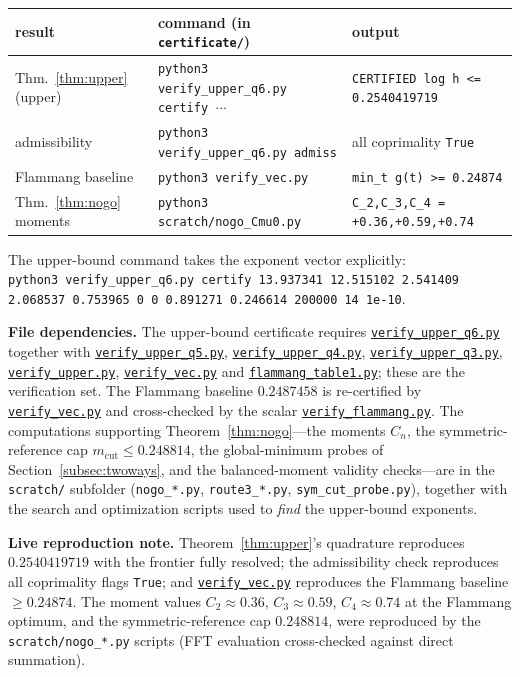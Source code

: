 \documentclass[11pt,reqno]{amsart}
\theoremstyle{plain}
\theoremstyle{definition}
\newcommand{\repofile}[1]{\href{https://github.com/tempcollab/optimizationproblems/blob/main/constants/82a/certificate/#1}{\texttt{#1}}}
\begin{document}
\begin{center}\small
\begin{tabular}{@{}lll@{}}
\toprule
result & command (in \texttt{certificate/}) & output\\
\midrule
Thm.~\ref{thm:upper} (upper) & \texttt{python3 verify\_upper\_q6.py certify} $\ \cdots$
  & \texttt{CERTIFIED log h <= 0.2540419719}\\
\;\;admissibility & \texttt{python3 verify\_upper\_q6.py admiss}
  & all coprimality \texttt{True}\\
Flammang baseline & \texttt{python3 verify\_vec.py}
  & \texttt{min\_t g(t) >= 0.24874}\\
Thm.~\ref{thm:nogo} moments & \texttt{python3 scratch/nogo\_Cmu0.py}
  & \texttt{C\_2,C\_3,C\_4 = +0.36,+0.59,+0.74}\\
\bottomrule
\end{tabular}
\end{center}

\noindent The upper-bound command takes the exponent vector explicitly:\\
\texttt{python3 verify\_upper\_q6.py certify 13.937341 12.515102 2.541409 2.068537
0.753965 0 0 0.891271 0.246614 200000 14 1e-10}.

\medskip
\noindent\textbf{File dependencies.}
The upper-bound certificate requires \repofile{verify\_upper\_q6.py} together with
\repofile{verify\_upper\_q5.py}, \repofile{verify\_upper\_q4.py},
\repofile{verify\_upper\_q3.py}, \repofile{verify\_upper.py},
\repofile{verify\_vec.py} and \repofile{flammang\_table1.py}; these are the
verification set. The Flammang baseline $0.2487458$ is re-certified by
\repofile{verify\_vec.py} and cross-checked by the scalar
\repofile{verify\_flammang.py}. The computations supporting
Theorem~\ref{thm:nogo}---the moments $C_n$, the symmetric-reference cap
$m_{\mathrm{cut}}\le0.248814$, the global-minimum probes of
Section~\ref{subsec:twoways}, and the balanced-moment validity checks---are in the
\texttt{scratch/} subfolder (\texttt{nogo\_*.py}, \texttt{route3\_*.py},
\texttt{sym\_cut\_probe.py}), together with the search and optimization scripts
used to \emph{find} the upper-bound exponents.

\medskip
\noindent\textbf{Live reproduction note.}
Theorem~\ref{thm:upper}'s quadrature reproduces $0.2540419719$ with the frontier
fully resolved; the admissibility check reproduces all coprimality flags
\texttt{True}; and \repofile{verify\_vec.py} reproduces the Flammang baseline
$\ge0.24874$. The moment values $C_2\approx0.36$, $C_3\approx0.59$,
$C_4\approx0.74$ at the Flammang optimum, and the symmetric-reference cap
$0.248814$, were reproduced by the \texttt{scratch/nogo\_*.py} scripts (FFT
evaluation cross-checked against direct summation).



\end{document}
